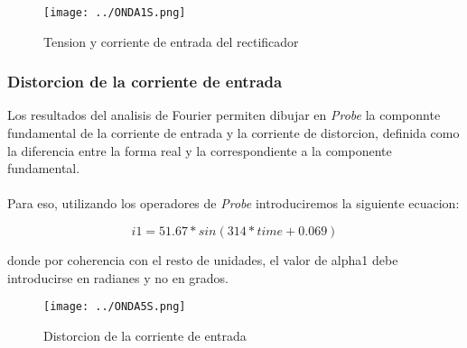 \documentclass[11pt,a4paper]{article}
\begin{document}
\begin{figure}[h]
\centering
\texttt{[image: ../ONDA1S.png]} 
\caption{Tension y corriente de entrada del rectificador}
\end{figure}

\subsubsection{Distorcion de la corriente de entrada}
Los resultados del analisis de Fourier permiten dibujar en \emph{Probe} la componnte fundamental de la corriente de entrada y la corriente de distorcion, definida como la diferencia entre la forma real y la correspondiente a la componente fundamental.\\
\\
Para eso, utilizando los operadores de \emph{Probe} introduciremos la siguiente ecuacion:

$$ i1 = 51.67 * sin(314*time + 0.069) $$

donde por coherencia con el resto de unidades, el valor de alpha1 debe introducirse en radianes y no en grados.

\begin{figure}[h]
\centering
\texttt{[image: ../ONDA5S.png]} 
\caption{Distorcion de la corriente de entrada}
\end{figure}
\end{document}
